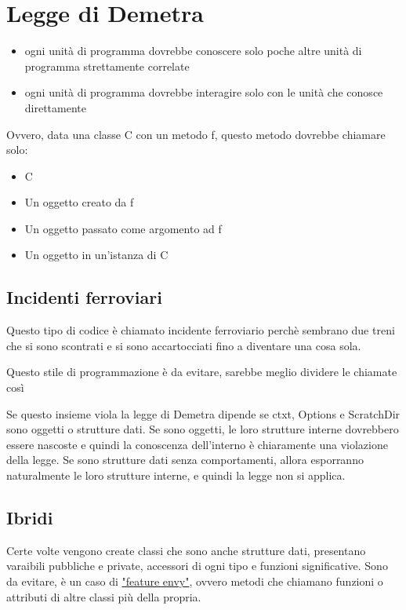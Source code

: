 \documentclass[11pt,a4paper]{book}
\begin{document}
\section{Legge di Demetra}
\begin{itemize}
	\item ogni unità di programma dovrebbe conoscere solo poche altre unità di programma strettamente correlate
	\item ogni unità di programma dovrebbe interagire solo con le unità che conosce direttamente
\end{itemize}

Ovvero, data una classe C con un metodo f, questo metodo dovrebbe chiamare solo:
\begin{itemize}
	\item C
	\item Un oggetto creato da f
	\item Un oggetto passato come argomento ad f
	\item Un oggetto in un'istanza di C
\end{itemize}

\subsection{Incidenti ferroviari}
\label{code: 040}
Questo tipo di codice è chiamato incidente ferroviario perchè sembrano due treni che si sono scontrati e si sono accartocciati fino a diventare una cosa sola.

Questo stile di programmazione è da evitare, sarebbe meglio dividere le chiamate così
\label{code: 041}

Se questo insieme viola la legge di Demetra dipende se ctxt, Options e ScratchDir sono oggetti o strutture dati. Se sono oggetti, le loro strutture interne dovrebbero essere nascoste e quindi la conoscenza dell'interno è chiaramente una violazione della legge. Se sono strutture dati senza comportamenti, allora esporranno naturalmente le loro strutture interne, e quindi la legge non si applica.

\subsection{Ibridi}
Certe volte vengono create classi che sono anche strutture dati, presentano varaibili pubbliche e private, accessori di ogni tipo e funzioni significative. Sono da evitare, è un caso di \href{https://refactoring.guru/smells/feature-envy}{"feature envy"}, ovvero metodi che chiamano funzioni o attributi di altre classi più della propria.
\end{document}
